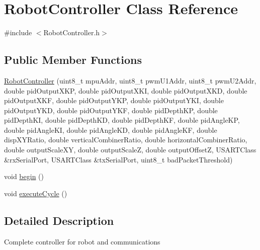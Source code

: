 \hypertarget{class_robot_controller}{\section{Robot\+Controller Class Reference}
\label{class_robot_controller}
}


{\ttfamily \#include $<$Robot\+Controller.\+h$>$}

\subsection*{Public Member Functions}
\begin{DoxyCompactItemize}
\item 
\hyperlink{class_robot_controller_a9521693023feb00c1e76535d92c37185}{Robot\+Controller} (uint8\+\_\+t mpu\+Addr, uint8\+\_\+t pwm\+U1\+Addr, uint8\+\_\+t pwm\+U2\+Addr, double pid\+Output\+X\+K\+P, double pid\+Output\+X\+K\+I, double pid\+Output\+X\+K\+D, double pid\+Output\+X\+K\+F, double pid\+Output\+Y\+K\+P, double pid\+Output\+Y\+K\+I, double pid\+Output\+Y\+K\+D, double pid\+Output\+Y\+K\+F, double pid\+Depth\+K\+P, double pid\+Depth\+K\+I, double pid\+Depth\+K\+D, double pid\+Depth\+K\+F, double pid\+Angle\+K\+P, double pid\+Angle\+K\+I, double pid\+Angle\+K\+D, double pid\+Angle\+K\+F, double disp\+X\+Y\+Ratio, double vertical\+Combiner\+Ratio, double horizontal\+Combiner\+Ratio, double output\+Scale\+X\+Y, double output\+Scale\+Z, double output\+Offset\+Z, U\+S\+A\+R\+T\+Class \&rx\+Serial\+Port, U\+S\+A\+R\+T\+Class \&tx\+Serial\+Port, uint8\+\_\+t bad\+Packet\+Threshold)
\item 
void \hyperlink{class_robot_controller_a2fb8b5e204c0139c86cf8495baf32847}{begin} ()
\item 
void \hyperlink{class_robot_controller_a38daa28e15d388b708adce81476a2688}{execute\+Cycle} ()
\end{DoxyCompactItemize}


\subsection{Detailed Description}
Complete controller for robot and communications 

